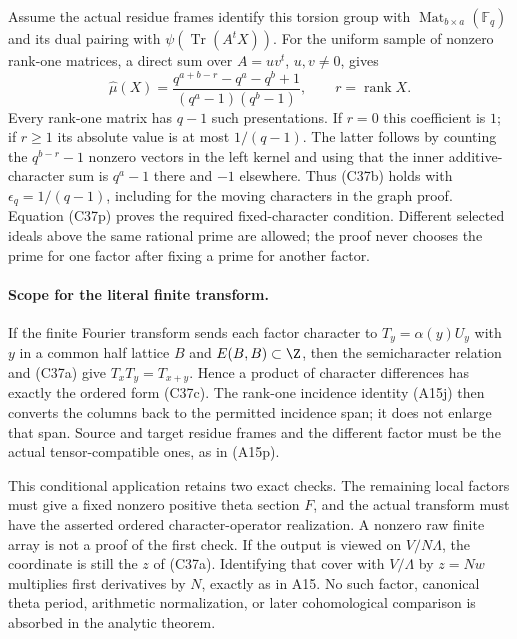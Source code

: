 Assume the actual residue frames identify this torsion group with
$\operatorname{Mat}_{b\times a}(\mathbb F_q)$ and its dual
pairing with $\psi(\operatorname{Tr}(A^tX))$.  For the uniform
sample of nonzero rank-one matrices, a direct sum over
$A=uv^t$, $u,v\ne0$, gives
\[
 \widehat\mu(X)=
 \frac{q^{a+b-r}-q^a-q^b+1}{(q^a-1)(q^b-1)},
                  \qquad r=\operatorname{rank}X.
 \tag{C37q}
\]
Every rank-one matrix has $q-1$ such presentations.  If $r=0$
this coefficient is $1$; if $r\ge1$ its absolute value is at
most $1/(q-1)$.  The latter follows by counting the
$q^{b-r}-1$ nonzero vectors in the left kernel and using that
the inner additive-character sum is $q^a-1$ there and $-1$
elsewhere.  Thus (C37b) holds with $\epsilon_q=1/(q-1)$,
including for the moving characters in the graph proof.
Equation (C37p) proves the required fixed-character condition.
Different selected ideals above the same rational prime are
allowed; the proof never chooses the prime for one factor after
fixing a prime for another factor.

\paragraph{Scope for the literal finite transform.}
If the finite Fourier transform sends each factor character to
$T_y=\alpha(y)U_y$ with $y$ in a common half lattice $B$ and
$E(B,B)\subset\Z$, then the semicharacter relation and (C37a)
give $T_xT_y=T_{x+y}$.  Hence a product of character differences
has exactly the ordered form (C37c).  The rank-one incidence
identity (A15j) then converts the columns back to the permitted
incidence span; it does not enlarge that span.  Source and target
residue frames and the different factor must be the actual
tensor-compatible ones, as in (A15p).

This conditional application retains two exact checks.  The
remaining local factors must give a fixed nonzero positive theta
section $F$, and the actual transform must have the asserted
ordered character-operator realization.  A nonzero raw finite
array is not a proof of the first check.  If the output is viewed
on $V/N\Lambda$, the coordinate is still the $z$ of (C37a).
Identifying that cover with $V/\Lambda$ by $z=Nw$ multiplies
first derivatives by $N$, exactly as in A15.  No such factor,
canonical theta period, arithmetic normalization, or later
cohomological comparison is absorbed in the analytic theorem.
